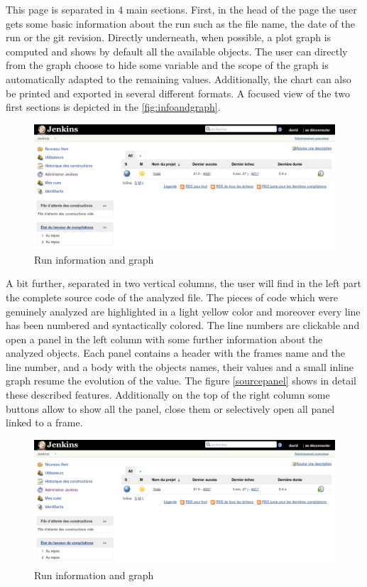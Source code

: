 This page is separated in 4 main sections. First, in the head of the page the user gets some basic information about the run such as the file name, the date of the run or the git revision. Directly underneath, when possible, a plot graph is computed and shows by default all the available objects. The user can directly from the graph choose to hide some variable and the scope of the graph is automatically adapted to the remaining values. Additionally, the chart can also be printed and exported in several different formats. A focused view of the two first sections is depicted in the \autoref{fig:infoandgraph}.
\begin{figure}[h!]
  \centering
    \includegraphics[width=\textwidth]{figures/jenkins.png}
    \caption{Run information and graph}
    \label{fig:infoandgraph}
\end{figure}

A bit further, separated in two vertical columns, the user will find in the left part the complete source code of the analyzed file. The pieces of code which were genuinely analyzed are highlighted in a light yellow color and moreover every line has been numbered and syntactically colored. The line numbers are clickable and open a panel in the left column with some further information about the analyzed objects. Each panel contains a header with the frames name and the line number, and a body with the objects names, their values and a small inline graph resume the evolution of the value. The figure \autoref{sourcepanel} shows in detail these described features. Additionally on the top of the right column some buttons allow to show all the panel, close them or selectively open all panel linked to a frame.

\begin{figure}[h!]
  \centering
    \includegraphics[width=\textwidth]{figures/jenkins.png}
    \caption{Run information and graph}
    \label{fig:sourcepanel}
\end{figure}

